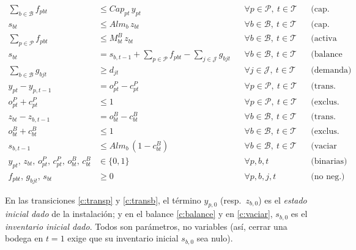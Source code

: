 \documentclass[11pt]{article}
\begin{document}
\begin{align}
\sum_{b\in\mathcal{B}} f_{pbt} &\le \mathit{Cap}_{pt}\,y_{pt}
&& \forall p\in\mathcal{P},\ t\in\mathcal{T}
&& \text{(cap.\ planta)} \label{c:capplanta}\\[2pt]
s_{bt} &\le \mathit{Alm}_{b}\,z_{bt}
&& \forall b\in\mathcal{B},\ t\in\mathcal{T}
&& \text{(cap.\ bodega)} \label{c:capbodega}\\[2pt]
\sum_{p\in\mathcal{P}} f_{pbt} &\le M^{B}_{bt}\,z_{bt}
&& \forall b\in\mathcal{B},\ t\in\mathcal{T}
&& \text{(activa bodega)} \label{c:activabodega}\\[2pt]
s_{bt} &= s_{b,t-1} + \sum_{p\in\mathcal{P}} f_{pbt} - \sum_{j\in\mathcal{J}} g_{bjt}
&& \forall b\in\mathcal{B},\ t\in\mathcal{T}
&& \text{(balance inv.)} \label{c:balance}\\[2pt]
\sum_{b\in\mathcal{B}} g_{bjt} &\ge d_{jt}
&& \forall j\in\mathcal{J},\ t\in\mathcal{T}
&& \text{(demanda)} \label{c:demanda}\\[2pt]
y_{pt} - y_{p,t-1} &= o^{P}_{pt} - c^{P}_{pt}
&& \forall p\in\mathcal{P},\ t\in\mathcal{T}
&& \text{(trans.\ planta)} \label{c:transp}\\[2pt]
o^{P}_{pt} + c^{P}_{pt} &\le 1
&& \forall p\in\mathcal{P},\ t\in\mathcal{T}
&& \text{(exclus.\ planta)} \label{c:exclp}\\[2pt]
z_{bt} - z_{b,t-1} &= o^{B}_{bt} - c^{B}_{bt}
&& \forall b\in\mathcal{B},\ t\in\mathcal{T}
&& \text{(trans.\ bodega)} \label{c:transb}\\[2pt]
o^{B}_{bt} + c^{B}_{bt} &\le 1
&& \forall b\in\mathcal{B},\ t\in\mathcal{T}
&& \text{(exclus.\ bodega)} \label{c:exclb}\\[2pt]
s_{b,t-1} &\le \mathit{Alm}_{b}\,(1 - c^{B}_{bt})
&& \forall b\in\mathcal{B},\ t\in\mathcal{T}
&& \text{(vaciar antes de cerrar)} \label{c:vaciar}\\[2pt]
y_{pt},\, z_{bt},\, o^{P}_{pt},\, c^{P}_{pt},\, o^{B}_{bt},\, c^{B}_{bt} &\in \{0,1\}
&& \forall p,b,t
&& \text{(binarias)} \label{c:bin}\\[2pt]
f_{pbt},\, g_{bjt},\, s_{bt} &\ge 0
&& \forall p,b,j,t
&& \text{(no neg.)} \label{c:noneg}
\end{align}

\noindent En las transiciones \eqref{c:transp} y \eqref{c:transb}, el término $y_{p,0}$ (resp.\ $z_{b,0}$) es el \emph{estado inicial dado} de la instalación; y en el balance \eqref{c:balance} y en \eqref{c:vaciar}, $s_{b,0}$ es el \emph{inventario inicial dado}. Todos son parámetros, no variables (así, cerrar una bodega en $t=1$ exige que su inventario inicial $s_{b,0}$ sea nulo).
\end{document}
